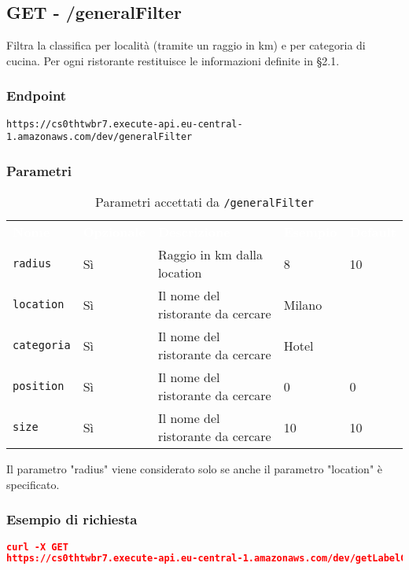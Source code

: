 \pagebreak

\subsection{GET - /generalFilter} 
Filtra la classifica per località (tramite un raggio in km) e per categoria di cucina. Per ogni ristorante restituisce le informazioni definite in §2.1.

\subsubsection{Endpoint}
\texttt{https://cs0thtwbr7.execute-api.eu-central-1.amazonaws.com/dev/generalFilter}

\subsubsection{Parametri}

\begin{table}[!htbp]
\renewcommand{\arraystretch}{1.5}

\begin{tabular}[t]{ m{}<{\centering}  m{}<{\centering} m{}<{\centering} m{}<{\centering}  m{}<{\centering} }
	\rowcolor{darkblue}
	\textcolor{white}{\textbf{Nome}} &\textcolor{white}{\textbf{Opzionale}} &\textcolor{white}{\textbf{Descrizione}} &\textcolor{white}{\textbf{Esempio}} &\textcolor{white}{\textbf{Default}} \\ 
\texttt{radius} & Sì & Raggio in km dalla location & 8 & 10  \\
\texttt{location} & Sì & Il nome del ristorante da cercare & Milano &  \\
\texttt{categoria} & Sì & Il nome del ristorante da cercare & Hotel \\
\texttt{position} & Sì & Il nome del ristorante da cercare & 0 & 0  \\
\texttt{size} & Sì & Il nome del ristorante da cercare & 10 & 10  \\

\end{tabular}
\caption{Parametri accettati da \texttt{/generalFilter}}
\end{table}
Il parametro "radius" viene considerato solo se anche il parametro "location" è specificato.



\subsubsection{Esempio di richiesta}
\begin{lstlisting}[language=json, caption={Esempio di richiesta \texttt{/searchByName}}, captionpos=b]
curl -X GET 
https://cs0thtwbr7.execute-api.eu-central-1.amazonaws.com/dev/getLabelCategoria?radius=10&location=Milano&categoria=Hotel&position=0&size=10

\end{lstlisting}

